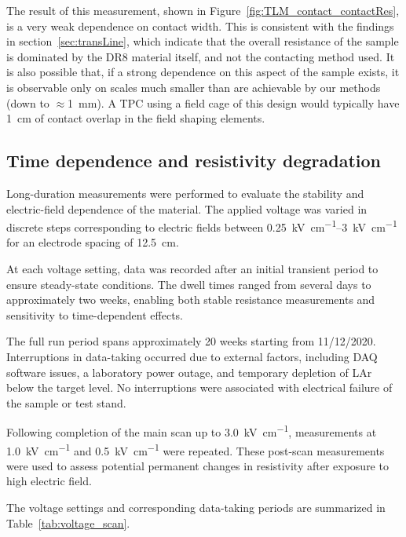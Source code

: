 \documentclass[a4paper,12pt]{article}
\newcommand{\DR}{DR8}
\begin{document}
The result of this measurement, shown in Figure~\ref{fig:TLM_contact_contactRes}, is a very weak dependence on contact width.  
This is consistent with the findings in section~\ref{sec:transLine}, which indicate that the overall resistance of the sample is dominated by the {\DR} material itself, and not the contacting method used.  
It is also possible that, if a strong dependence on this aspect of the sample exists, it is observable only on scales much smaller than are achievable by our methods (down to $\approx$\SI{1}{\milli\meter}).  
A TPC using a field cage of this design would typically have \SI{1}{\centi\metre} of contact overlap in the field shaping elements.


\subsection{Time dependence and resistivity degradation}
\label{resdecayfit}

Long-duration measurements were performed to evaluate the stability and electric-field dependence of the material.
The applied voltage was varied in discrete steps corresponding to electric fields between \SIrange{0.25}{3}{\kilo\volt\per\centi\metre} for an electrode spacing of \SI{12.5}{\centi\metre}.


At each voltage setting, data was recorded after an initial transient period to ensure steady-state conditions.
The dwell times ranged from several days to approximately two weeks, enabling both stable resistance measurements and sensitivity to time-dependent effects.

The full run period spans approximately 20 weeks starting from 11/12/2020.
Interruptions in data-taking occurred due to external factors, including DAQ software issues, a laboratory power outage, and temporary depletion of LAr below the target level.
No interruptions were associated with electrical failure of the sample or test stand.

Following completion of the main scan up to \SI{3.0}{\kilo\volt\per\centi\metre}, measurements at \SI{1.0}{\kilo\volt\per\centi\metre} and \SI{0.5}{\kilo\volt\per\centi\metre} were repeated.
These post-scan measurements were used to assess potential permanent changes in resistivity after exposure to high electric field.

The voltage settings and corresponding data-taking periods are summarized in Table~\ref{tab:voltage_scan}.
\end{document}
